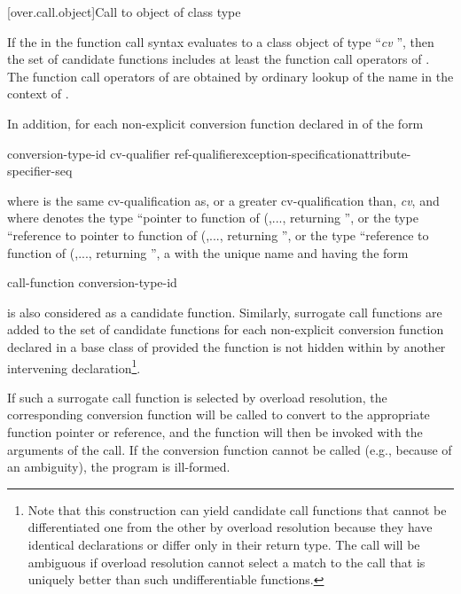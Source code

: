 [over.call.object]{Call to object of class type}

\pnum
If the
in the function call syntax evaluates
to a class object of type ``\textit{cv}
'',
then the set of candidate
functions includes at least the function call operators of
.
The
function call operators of
are obtained by ordinary lookup of
the name
in the context of
.

\pnum
In addition, for each non-explicit conversion function declared in  of the
form

\begin{ncsimplebnf}
 conversion-type-id \terminal{(\,)} cv-qualifier ref-qualifier\opt exception-specification\opt attribute-specifier-seq\opt \terminal{;}
\end{ncsimplebnf}

where
is the same cv-qualification as, or a greater cv-qualification than,
\textit{cv},
and where
denotes the type ``pointer to function
of (,..., returning '',
or the type ``reference to pointer to function
of (,..., returning '',
or the type
``reference to function of (,...,
returning '', a  with the unique name
and having the form

\begin{ncbnf}
 call-function \terminal{(} conversion-type-id  
\end{ncbnf}

is also considered as a candidate function.
Similarly, surrogate
call functions are added to the set of candidate functions for
each non-explicit conversion function declared in a base class of
provided the function is not hidden within
by another
intervening declaration\footnote{Note that this construction can yield
candidate call functions that cannot be
differentiated one from the other by overload resolution because they have
identical
declarations or differ only in their return type.
The call will be ambiguous
if overload
resolution cannot select a match to the call that is uniquely better than such
undifferentiable functions.}.

\pnum
If such a surrogate call function is selected by overload
resolution, the corresponding conversion function will be called to convert
to the appropriate function pointer or reference, and the function
will then be invoked with the arguments of the call. If the
conversion function cannot be called (e.g., because of an ambiguity),
the program is ill-formed.

